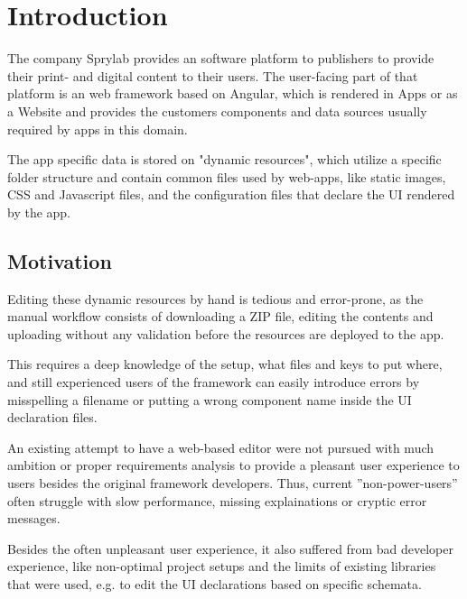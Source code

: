 \section{Introduction}
\label{sec:introduction}
The company Sprylab provides an software platform to publishers to provide their print- and digital content to their users. The user-facing part of that platform is an web framework based on Angular, which is rendered in Apps or as a Website and provides the customers components and data sources usually required by apps in this domain.

The app specific data is stored on "dynamic resources", which utilize a specific folder structure and contain common files used by web-apps, like static images, CSS and Javascript files, and the configuration files that declare the UI rendered by the app.

\subsection{Motivation}
\label{subsec:motivation}
Editing these dynamic resources by hand is tedious and error-prone, as the manual workflow consists of downloading a ZIP file, editing the contents and uploading without any validation before the resources are deployed to the app.

This requires a deep knowledge of the setup, what files and keys to put where, and still experienced users of the framework can easily introduce errors by misspelling a filename or putting a wrong component name inside the UI declaration files.

An existing attempt to have a web-based editor were not pursued with much ambition or proper requirements analysis to provide a pleasant user experience to users besides the original framework developers.
Thus, current ''non-power-users'' often struggle with slow performance, missing explainations or cryptic error messages.

Besides the often unpleasant user experience, it also suffered from bad developer experience, like non-optimal project setups and the limits of existing libraries that were used,
e.g. to edit the UI declarations based on specific schemata.

